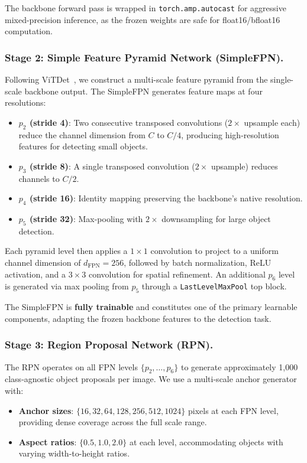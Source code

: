 \documentclass[runningheads]{llncs}
\begin{document}
The backbone forward pass is wrapped in \texttt{torch.amp.autocast} for aggressive mixed-precision inference, as the frozen weights are safe for float16/bfloat16 computation.

\subsubsection{Stage 2: Simple Feature Pyramid Network (SimpleFPN).}
\label{sec:fpn}
Following ViTDet~\cite{li2022vitdet}, we construct a multi-scale feature pyramid from the single-scale backbone output.
The SimpleFPN generates feature maps at four resolutions:

\begin{itemize}
    \item \textbf{$p_2$ (stride 4)}: Two consecutive transposed convolutions ($2\times$ upsample each) reduce the channel dimension from $C$ to $C/4$, producing high-resolution features for detecting small objects.
    
    \item \textbf{$p_3$ (stride 8)}: A single transposed convolution ($2\times$ upsample) reduces channels to $C/2$.
    
    \item \textbf{$p_4$ (stride 16)}: Identity mapping preserving the backbone's native resolution.
    
    \item \textbf{$p_5$ (stride 32)}: Max-pooling with $2\times$ downsampling for large object detection.
\end{itemize}

Each pyramid level then applies a $1 \times 1$ convolution to project to a uniform channel dimension of $d_{\text{FPN}} = 256$, followed by batch normalization, ReLU activation, and a $3 \times 3$ convolution for spatial refinement.
An additional $p_6$ level is generated via max pooling from $p_5$ through a \texttt{LastLevelMaxPool} top block.

The SimpleFPN is \textbf{fully trainable} and constitutes one of the primary learnable components, adapting the frozen backbone features to the detection task.

\subsubsection{Stage 3: Region Proposal Network (RPN).}
\label{sec:rpn}
The RPN operates on all FPN levels $\{p_2, \ldots, p_6\}$ to generate approximately 1,000 class-agnostic object proposals per image.
We use a multi-scale anchor generator with:
\begin{itemize}
    \item \textbf{Anchor sizes}: $\{16, 32, 64, 128, 256, 512, 1024\}$ pixels at each FPN level, providing dense coverage across the full scale range.
    \item \textbf{Aspect ratios}: $\{0.5, 1.0, 2.0\}$ at each level, accommodating objects with varying width-to-height ratios.
\end{itemize}
\end{document}
